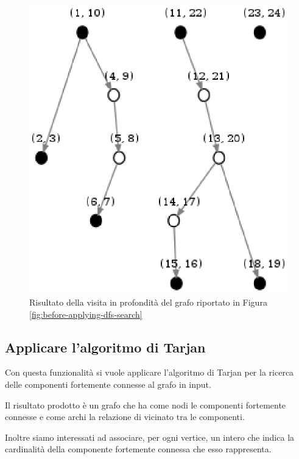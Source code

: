 \begin{figure}
  \centering
  \includegraphics{images/OnePipingLevelUnitTest_Printer_DFS_PrinterPipe_Papadimitriou-phase-PrinterPipeFilter-level-2.eps}
  \caption{Risultato della visita in profondit\`a del grafo riportato
    in Figura \ref{fig:before-applying-dfs-search}}
  \label{fig:dfs-forest}
\end{figure}

\subsection{Applicare l'algoritmo di Tarjan}
\label{subsection:use-case-tarjan}
Con questa funzionalit\`a si vuole applicare l'algoritmo di Tarjan per
la ricerca delle componenti fortemente connesse al grafo in input.

Il risultato prodotto \`e un grafo che ha come nodi le componenti
fortemente connesse e come archi la relazione di vicinato tra le
componenti.

Inoltre siamo interessati ad associare, per ogni vertice, un intero
che indica la cardinalit\`a della componente fortemente connessa che
esso rappresenta.

